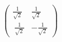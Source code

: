 \documentclass[preview]{standalone}
\begin{document}
\begin{align*}
\begin{pmatrix} \frac{1}{\sqrt{2}} & \frac{1}{\sqrt{2}} \\ \
                          \frac{1}{\sqrt{2}} & -\frac{1}{\sqrt{2}} \end{pmatrix}
\end{align*}
\end{document}
